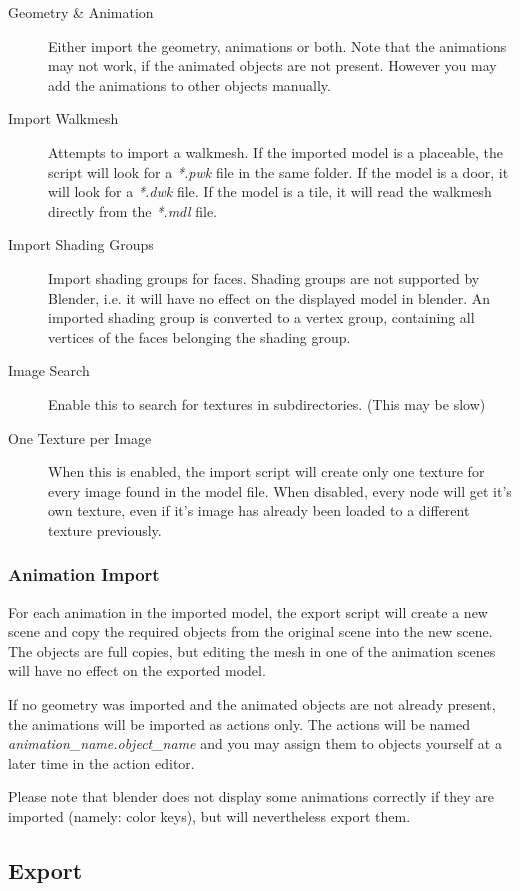 \documentclass[a4paper]{article}
\begin{document}
\begin{description}
    \item[Geometry \& Animation] Either import the geometry, animations or both. Note that the animations may not work, if the animated objects are not present. However you may add the animations to other objects manually.
    \item[Import Walkmesh] Attempts to import a walkmesh. If the imported model is a placeable, the script will look for a {\textit{*.pwk}} file in the same folder. If the model is a door, it will look for a {\textit{*.dwk}} file. If the model is a tile, it will read the walkmesh directly from the {\textit{*.mdl}} file.
    \item[Import Shading Groups] Import shading groups for faces. Shading groups are not supported by Blender, i.e. it will have no effect on the displayed model in blender. An imported shading group is converted to a vertex group, containing all vertices of the faces belonging the shading group.
    \item[Image Search] Enable this to search for textures in subdirectories. (This may be slow)
    \item[One Texture per Image] When this is enabled, the import script will create only one texture for every image found in the model file. When disabled, every node will get it's own texture, even if it's image has already been loaded to a different texture previously.
\end{description}

\subsubsection*{Animation Import}
For each animation in the imported model, the export script will create a new scene and copy the required objects from the original scene into the new scene. The objects are full copies, but editing the mesh in one of the animation scenes will have no effect on the exported model.

If no geometry was imported and the animated objects are not already present, the animations will be imported as actions only. The actions will be named {\textit{animation\_name.object\_name}} and you may assign them to objects yourself at a later time in the action editor.

Please note that blender does not display some animations correctly if they are imported (namely: color keys), but will nevertheless export them.

\subsection{Export}
\end{document}
